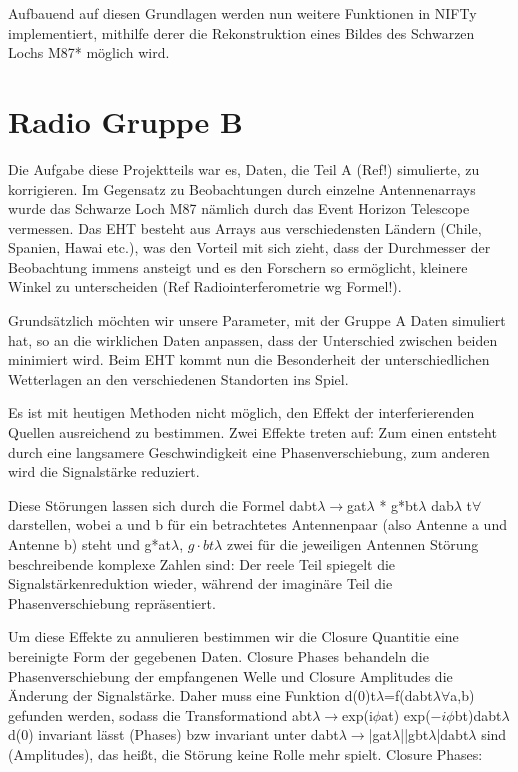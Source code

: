 \documentclass[]{dsadokumentation}
\begin{document}
Aufbauend auf diesen Grundlagen werden nun weitere Funktionen in NIFTy implementiert, mithilfe derer die Rekonstruktion eines Bildes des Schwarzen Lochs M87* möglich wird.

\section{Radio Gruppe B}
Die Aufgabe diese Projektteils war es, Daten, die Teil A (Ref!) simulierte, zu korrigieren. Im Gegensatz zu Beobachtungen durch einzelne Antennenarrays wurde das Schwarze Loch M87 nämlich durch das Event Horizon Telescope vermessen. Das EHT besteht aus Arrays aus verschiedensten Ländern (Chile, Spanien, Hawai etc.), was den Vorteil mit sich zieht, dass der Durchmesser der Beobachtung immens ansteigt und es den Forschern so ermöglicht, kleinere Winkel zu unterscheiden (Ref Radiointerferometrie wg Formel!).

Grundsätzlich möchten wir unsere Parameter, mit der Gruppe A Daten simuliert hat, so an die wirklichen Daten anpassen, dass der Unterschied zwischen beiden minimiert wird. Beim EHT kommt nun die Besonderheit der unterschiedlichen Wetterlagen an den verschiedenen Standorten ins Spiel.

Es ist mit heutigen Methoden nicht möglich, den Effekt der interferierenden Quellen ausreichend zu bestimmen. Zwei Effekte treten auf: Zum einen entsteht durch eine langsamere Geschwindigkeit eine Phasenverschiebung, zum anderen wird die Signalstärke reduziert.

Diese Störungen lassen sich durch die Formel dabt$\lambda$$\to$gat$\lambda$ * g*bt$\lambda$ dab$\lambda$  t$\forall$                 darstellen, wobei a und b für ein betrachtetes Antennenpaar (also Antenne a und Antenne b) steht und g*at$\lambda$,  $g \cdot bt \lambda$ zwei für die jeweiligen Antennen Störung beschreibende komplexe Zahlen sind: Der reele Teil spiegelt die Signalstärkenreduktion wieder, während der imaginäre Teil die Phasenverschiebung repräsentiert.

Um diese Effekte zu annulieren bestimmen wir die Closure Quantitie eine bereinigte Form der gegebenen Daten. Closure Phases behandeln die Phasenverschiebung der empfangenen Welle und Closure Amplitudes die Änderung der Signalstärke. Daher muss eine Funktion d(0)t$\lambda$=f(dabt$\lambda$$\forall$a,b) gefunden werden, sodass die Transformationd abt$\lambda$$\to$exp(i$\phi$at) exp($-i \phi$bt)dabt$\lambda$ d(0) invariant lässt (Phases) bzw invariant unter dabt$\lambda$$\to$|gat$\lambda$||gbt$\lambda$|dabt$\lambda$ sind (Amplitudes), das heißt, die Störung keine Rolle mehr spielt.
Closure Phases:
\end{document}
